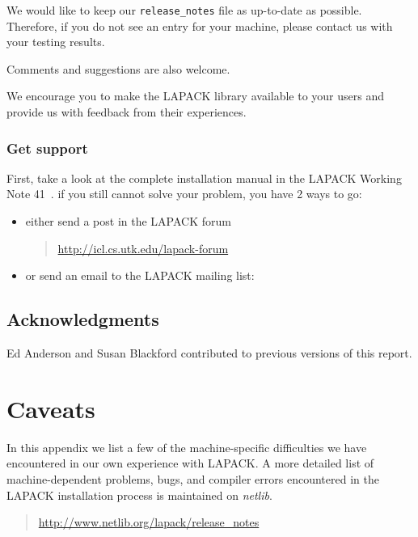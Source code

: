 \documentclass[11pt]{report}
\begin{document}
We would like to keep our \texttt{release\_notes} file as up-to-date as possible.
Therefore, if you do not see an entry for your machine, please contact us
with your testing results.

Comments and suggestions are also welcome.

We encourage you to make the LAPACK library available to your
users and provide us with feedback from their experiences.

\subsection{Get support}\label{getsupport}
First, take a look at the complete installation manual in the LAPACK Working Note 41~\cite{WN41}.
if you still cannot solve your problem, you have 2 ways to go:
\begin{itemize}
\item
either send a post in the LAPACK forum
\begin{quote}
\url{http://icl.cs.utk.edu/lapack-forum}
\end{quote}
\item
or send an email to the LAPACK mailing list:
\end{itemize}
\section*{Acknowledgments}

Ed Anderson and Susan Blackford contributed to previous versions of this report.

\appendix

\chapter{Caveats}\label{appendixd}

In this appendix we list a few of the machine-specific difficulties we
have
encountered in our own experience with LAPACK.  A more detailed list
of machine-dependent problems, bugs, and compiler errors encountered
in the LAPACK installation process is maintained
on \emph{netlib}.
\begin{quote}
\url{http://www.netlib.org/lapack/release\_notes}
\end{quote}
\end{document}
